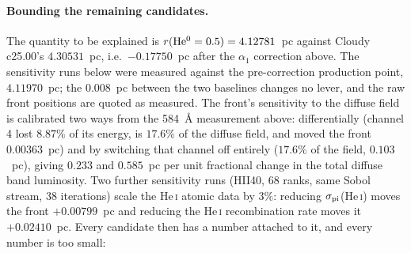 \documentclass[english,a4paper]{my_memo}
\begin{document}
\paragraph{Bounding the remaining candidates.}  The quantity to be explained
is $r({\rm He^0}=0.5) = 4.12781$~pc against Cloudy c25.00's $4.30531$~pc,
i.e.\ $-0.17750$~pc after the $\alpha_1$ correction above.  The sensitivity
runs below were measured against the pre-correction production point,
$4.11970$~pc; the $0.008$~pc between the two baselines changes no lever, and
the raw front positions are quoted as measured.  The front's sensitivity to
the diffuse field is
calibrated two ways from the 584~\AA{} measurement above: differentially
(channel 4 lost $8.87\%$ of its energy, is $17.6\%$ of the diffuse field, and
moved the front $0.00363$~pc) and by switching that channel off entirely
($17.6\%$ of the field, $0.103$~pc), giving $0.233$ and $0.585$~pc per unit
fractional change in the total diffuse band luminosity.  Two further
sensitivity runs (HII40, 68 ranks, same Sobol stream, 38 iterations) scale
the He\,\textsc{i} atomic data by $3\%$: reducing
$\sigma_{\rm pi}$(He\,\textsc{i})
moves the front $+0.00799$~pc and reducing the He\,\textsc{i} recombination
rate moves it $+0.02410$~pc.  Every candidate then has a number attached to
it, and every number is too small:
\end{document}
